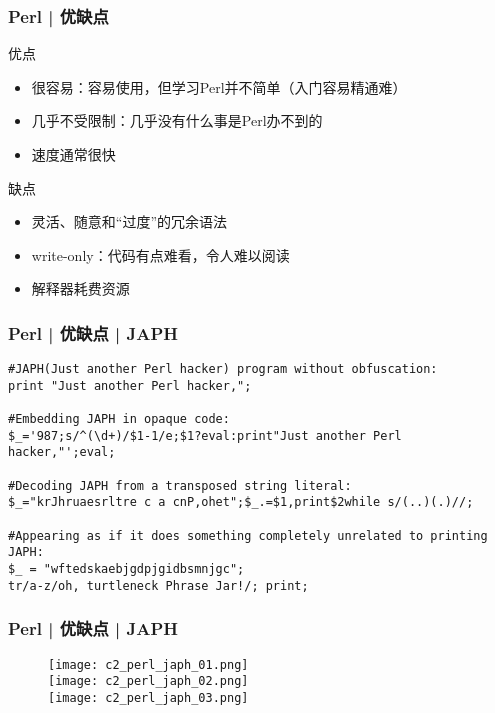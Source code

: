 \begin{frame}
  \frametitle{Perl | 优缺点}
  \begin{block}{优点}
    \begin{itemize}
      \item 很容易：容易使用，但学习Perl并不简单（入门容易精通难）
      \item 几乎不受限制：几乎没有什么事是Perl办不到的
      \item 速度通常很快
    \end{itemize}
  \end{block}
  \pause
  \begin{block}{缺点}
    \begin{itemize}
      \item 灵活、随意和“过度”的冗余语法
      \item write-only：代码有点难看，令人难以阅读
      \item 解释器耗费资源
    \end{itemize}
  \end{block}
\end{frame}

\begin{frame}[fragile]
  \frametitle{Perl | 优缺点 | JAPH}
  \vspace{-1.5em}
\begin{lstlisting}[basicstyle=\small\tt]
#JAPH(Just another Perl hacker) program without obfuscation:
print "Just another Perl hacker,";

#Embedding JAPH in opaque code:
$_='987;s/^(\d+)/$1-1/e;$1?eval:print"Just another Perl hacker,"';eval;

#Decoding JAPH from a transposed string literal:
$_="krJhruaesrltre c a cnP,ohet";$_.=$1,print$2while s/(..)(.)//;

#Appearing as if it does something completely unrelated to printing JAPH:
$_ = "wftedskaebjgdpjgidbsmnjgc";
tr/a-z/oh, turtleneck Phrase Jar!/; print;
\end{lstlisting}
\end{frame}

\begin{frame}
  \frametitle{Perl | 优缺点 | JAPH}
  \begin{figure}
    \centering
    \texttt{[image: c2\_perl\_japh\_01.png]}\\
    \vspace{1em}
    \texttt{[image: c2\_perl\_japh\_02.png]}\\
    \vspace{1em}
    \texttt{[image: c2\_perl\_japh\_03.png]}
  \end{figure}
\end{frame}

